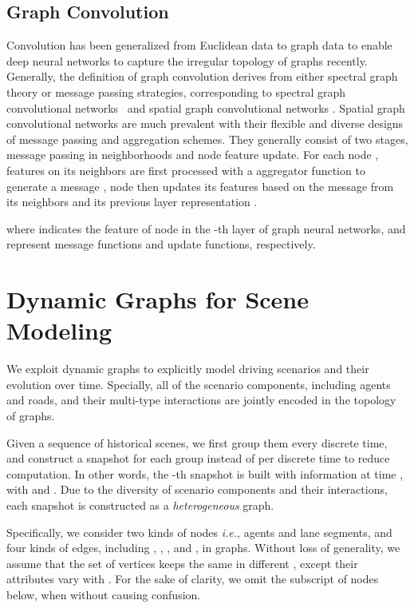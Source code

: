 \documentclass[letterpaper, 10 pt, conference]{ieeeconf}
\begin{document}
\subsection{Graph Convolution}
Convolution has been generalized from Euclidean data to graph data to enable deep neural networks to capture the irregular topology of graphs recently. Generally, the definition of graph convolution derives from either spectral graph theory or message passing strategies, corresponding to spectral graph convolutional networks~\cite{bruna2013spectral,defferrard2016convolutional,khasanova2017graph,bianchi2019graph} and spatial graph convolutional networks \cite{gilmer2017neural,velikovi2018graph,hamilton2017inductive,xu2018how}. 
Spatial graph convolutional networks are much prevalent with their flexible and diverse designs of message passing and aggregation schemes. They generally consist of two stages, message passing in neighborhoods and node feature  update. For each node , features on its neighbors  are first processed with a aggregator function  to generate a message , node  then updates its features based on the message from its neighbors and its previous layer representation .

where  indicates the feature of node  in the -th layer of graph neural networks,  and  represent message functions and update functions, respectively.

\section{Dynamic Graphs for Scene Modeling}
\label{sec.graph}
We exploit dynamic graphs to explicitly model driving scenarios and their evolution over time. Specially, all of the scenario components, including agents and roads, and their multi-type interactions are jointly encoded in the topology of graphs.

Given a sequence of historical scenes, we first group them every  discrete time, and construct a snapshot for each group instead of per discrete time to reduce computation. In other words, the -th snapshot  is built with information at time ,  with  and . Due to the diversity of scenario components and their interactions, each snapshot is constructed as a \textit{heterogeneous} graph.

Specifically, we consider two kinds of nodes  \textit{i.e.}, agents and lane segments,  and four kinds of edges, including , , , and , in graphs. Without loss of generality, we assume that the set of vertices   keeps the same in different , except their attributes vary with .  For the sake of clarity, we omit the subscript  of nodes  below,  when without causing confusion.
\end{document}
